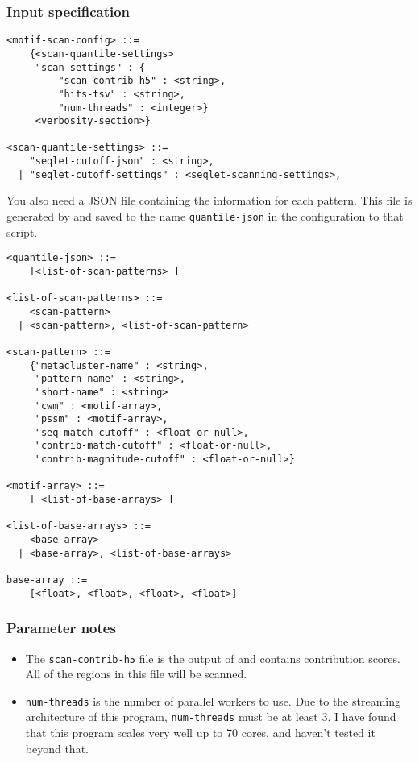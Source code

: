 \documentclass{article}
\begin{document}
\subsubsection{Input specification}

\begin{lstlisting}
<motif-scan-config> ::=
    {<scan-quantile-settings>
     "scan-settings" : {
         "scan-contrib-h5" : <string>,
         "hits-tsv" : <string>,
         "num-threads" : <integer>}
     <verbosity-section>}

<scan-quantile-settings> ::=
    "seqlet-cutoff-json" : <string>,
  | "seqlet-cutoff-settings" : <seqlet-scanning-settings>,
\end{lstlisting}

You also need a JSON file containing the information for each pattern.
This file is generated by  and saved to the name
\texttt{quantile-json} in the configuration to that script.

\begin{lstlisting}
<quantile-json> ::=
    [<list-of-scan-patterns> ]

<list-of-scan-patterns> ::=
    <scan-pattern>
  | <scan-pattern>, <list-of-scan-pattern>

<scan-pattern> ::=
    {"metacluster-name" : <string>,
     "pattern-name" : <string>,
     "short-name" : <string>
     "cwm" : <motif-array>,
     "pssm" : <motif-array>,
     "seq-match-cutoff" : <float-or-null>,
     "contrib-match-cutoff" : <float-or-null>,
     "contrib-magnitude-cutoff" : <float-or-null>}

<motif-array> ::=
    [ <list-of-base-arrays> ]

<list-of-base-arrays> ::=
    <base-array>
  | <base-array>, <list-of-base-arrays>

base-array ::=
    [<float>, <float>, <float>, <float>]
\end{lstlisting}


\subsubsection{Parameter notes}
\begin{itemize}
    \item The \texttt{scan-contrib-h5} file is the output of 
        and contains contribution scores.
        All of the regions in this file will be scanned.
    \item \texttt{num-threads} is the number of parallel workers to use.
        Due to the streaming architecture of this program, \texttt{num-threads}
        must be at least 3.
        I have found that this program scales very well up to 70 cores,
        and haven't tested it beyond that.
\end{itemize}
\end{document}

